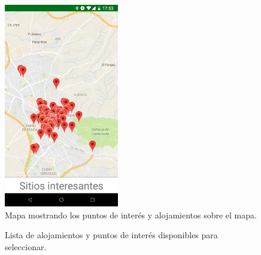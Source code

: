 \newpage
\begin{figure}[H]
	\centering
	\includegraphics[width=50mm]{imagenes/main_activity_map}
	\caption{Mapa mostrando los puntos de interés y alojamientos sobre el mapa.}
	\label{fig:main_activity_map}
\end{figure}
\vspace{0.06in}
\begin{figure}[H]
	\centering
	\caption{Lista de alojamientos y puntos de interés disponibles para seleccionar.}
	\label{fig:main_activity_list}
\end{figure}

